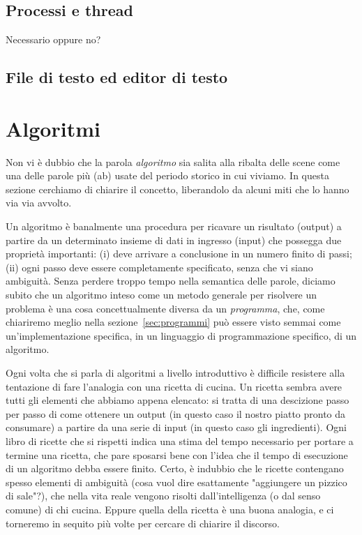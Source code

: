 \subsection{Processi e thread}

Necessario oppure no?


\subsection{File di testo ed editor di testo}



\section{Algoritmi}

Non vi \`e dubbio che la parola \emph{algoritmo} sia salita alla ribalta delle scene
come una delle parole pi\`u (ab) usate del periodo storico in cui viviamo. In questa
sezione cerchiamo di chiarire il concetto, liberandolo da alcuni miti che lo hanno
via via avvolto.

Un algoritmo \`e banalmente una procedura per ricavare un risultato (output)
a partire da un determinato insieme di dati in ingresso (input) che possegga due
propriet\`a importanti: (i) deve arrivare a conclusione in un numero finito di passi;
(ii) ogni passo deve essere completamente specificato, senza che vi siano ambiguit\`a.
Senza perdere troppo tempo nella semantica delle parole, diciamo subito che un algoritmo
inteso come un metodo generale per risolvere un problema \`e una cosa concettualmente
diversa da un \emph{programma}, che, come chiariremo meglio nella sezione~\ref{sec:programmi}
pu\`o essere visto semmai come un'implementazione specifica, in un linguaggio di
programmazione specifico, di un algoritmo.

Ogni volta che si parla di algoritmi a livello introduttivo \`e difficile resistere
alla tentazione di fare l'analogia con una ricetta di cucina. Un ricetta sembra avere
tutti gli elementi che abbiamo appena elencato: si tratta di una descizione passo
per passo di come ottenere un output (in questo caso il nostro piatto pronto da
consumare) a partire da una serie di input (in questo caso gli ingredienti). Ogni
libro di ricette che si rispetti indica una stima del tempo necessario per portare
a termine una ricetta, che pare sposarsi bene con l'idea che il tempo di esecuzione
di un algoritmo debba essere finito. Certo, \`e indubbio che le ricette contengano
spesso elementi di ambiguit\`a (cosa vuol dire esattamente "aggiungere un pizzico di
sale"?), che nella vita reale vengono risolti dall'intelligenza (o dal senso comune)
di chi cucina. Eppure quella della ricetta \`e una buona analogia, e ci torneremo in
sequito pi\`u volte per cercare di chiarire il discorso.


